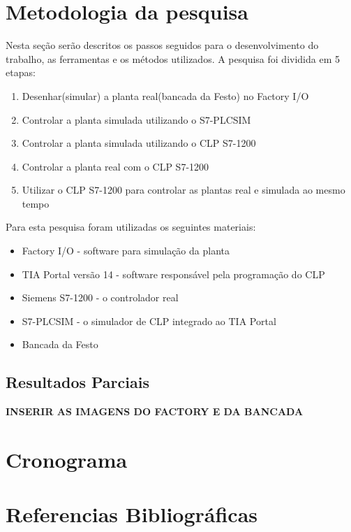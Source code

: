 \documentclass[a4paper, 12pt]{article}
\begin{document}
\section{Metodologia da pesquisa}
	
	Nesta seção serão descritos os passos seguidos para o desenvolvimento do trabalho,
	as ferramentas e os métodos utilizados.
	A pesquisa foi dividida em 5 etapas:
	\begin{enumerate}
		\item Desenhar(simular) a planta real(bancada da Festo) no Factory I/O
		\item Controlar a planta simulada utilizando o S7-PLCSIM
		\item Controlar a planta simulada utilizando o CLP S7-1200
		\item Controlar a planta real com o CLP S7-1200
		\item Utilizar o CLP S7-1200 para controlar as plantas real e simulada ao mesmo tempo
	\end{enumerate}

	
	Para esta pesquisa foram utilizadas os seguintes materiais:
		
	\begin{itemize}
		\item Factory I/O - software para simulação da planta
		\item TIA Portal versão 14 - software responsável pela programação do CLP
		\item Siemens S7-1200 - o controlador real
		\item S7-PLCSIM - o simulador de CLP integrado ao TIA Portal
		\item Bancada da Festo
	\end{itemize}

	\subsection{Resultados Parciais}
	
	\textbf{INSERIR AS IMAGENS DO FACTORY E DA BANCADA}

\section{Cronograma}

\section{Referencias Bibliográficas}
\end{document}
